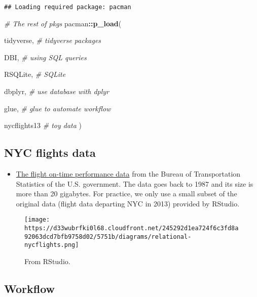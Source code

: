 \documentclass[
]{book}
\newenvironment{Shaded}{\begin{snugshade}}{\end{snugshade}}
\newcommand{\CommentTok}[1]{\textcolor[rgb]{0.56,0.35,0.01}{\textit{#1}}}
\newcommand{\KeywordTok}[1]{\textcolor[rgb]{0.13,0.29,0.53}{\textbf{#1}}}
\newcommand{\NormalTok}[1]{#1}
\newcommand{\OperatorTok}[1]{\textcolor[rgb]{0.81,0.36,0.00}{\textbf{#1}}}
\providecommand{\tightlist}{%
  \setlength{\itemsep}{0pt}\setlength{\parskip}{0pt}}
\begin{document}
\begin{verbatim}
## Loading required package: pacman
\end{verbatim}

\begin{Shaded}
\begin{Highlighting}[]
\CommentTok{\# The rest of pkgs }
\NormalTok{pacman}\OperatorTok{::}\KeywordTok{p\_load}\NormalTok{(}
 
\NormalTok{ tidyverse, }\CommentTok{\# tidyverse packages }
 
\NormalTok{ DBI, }\CommentTok{\# using SQL queries}
 
\NormalTok{ RSQLite, }\CommentTok{\# SQLite}
 
\NormalTok{ dbplyr, }\CommentTok{\# use database with dplyr }
 
\NormalTok{ glue, }\CommentTok{\# glue to automate workflow }
 
\NormalTok{ nycflights13 }\CommentTok{\# toy data }
\NormalTok{)}
\end{Highlighting}
\end{Shaded}

\hypertarget{nyc-flights-data}{%
\subsection{NYC flights data}\label{nyc-flights-data}}

\begin{itemize}
\tightlist
\item
  \href{https://www.transtats.bts.gov/DL_SelectFields.asp?Table_ID=236}{The flight on-time performance data} from the Bureau of Transportation Statistics of the U.S. government. The data goes back to 1987 and its size is more than 20 gigabytes. For practice, we only use a small subset of the original data (flight data departing NYC in 2013) provided by RStudio.
\end{itemize}

\begin{figure}
\centering
\texttt{[image: https://d33wubrfki0l68.cloudfront.net/245292d1ea724f6c3fd8a92063dcd7bfb9758d02/5751b/diagrams/relational-nycflights.png]}
\caption{From RStudio.}
\end{figure}

\hypertarget{workflow-4}{%
\subsection{Workflow}\label{workflow-4}}
\end{document}
